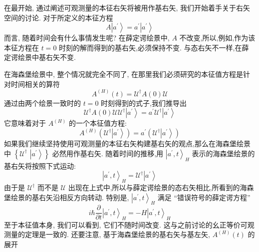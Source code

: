 \documentclass[lang=cn,newtx,10pt,scheme=chinese,thmcnt=section]{elegantbook}
\begin{document}
在最开始, 通过阐述可观测量的本征右矢将被用作基右矢, 我们开始着手关于右矢空间的讨论. 对于所定义的本征方程
\begin{equation}
	A\left| {a}^{\prime }\right\rangle = {a}^{\prime }\left| {a}^{\prime }\right\rangle
\end{equation}
而言, 随着时间会有什么事情发生呢? 在薛定谔绘景中, $A$ 不改变,所以,例如,作为该本征方程在 $t = 0$ 时刻的解而得到的基右矢,必须保持不变. 与态右矢不一样,在薛定谔绘景中基右矢不变.

在海森堡绘景中, 整个情况就完全不同了, 在那里我们必须研究的本征值方程是针对时间相关的算符
\begin{equation}
	{A}^{\left( H\right) }\left( t\right) =\mathcal{U}^{ \dagger }A\left( 0\right)\mathcal{U}
\end{equation}
通过由两个绘景一致时的 $t = 0$ 时刻得到的式子,我们推导出
\begin{equation}
	\mathcal{U}^{ \dagger }A\left( 0\right) \mathcal{U}\mathcal{U}^{ \dagger }\left| {a}^{\prime }\right\rangle = {a}^{\prime }\mathcal{U}^{ \dagger }\left| {a}^{\prime }\right\rangle
\end{equation}
它意味着对于 ${A}^{\left( H\right) }$ 的一个本征值方程:
\begin{equation}
	{A}^{\left( H\right) }\left( {\mathcal{U}^{ \dagger }\left| {a}^{\prime }\right\rangle }\right) = {a}^{\prime }\left( {\mathcal{U}^{ \dagger }\left| {a}^{\prime }\right\rangle }\right)
\end{equation}
如果我们继续坚持使用可观测量的本征右矢构建基右矢的观点,那么在海森堡绘景中 $\left\{ \mathcal{U}^\dagger\right.$ $\left. \left| {a}^{\prime }\right\rangle \right\}$ 必然用作基右矢. 随着时间的推移,用 ${\left| {a}^{\prime }, t\right\rangle }_{H}$ 表示的海森堡绘景的基右矢将按照下式运动:
\begin{equation}\label{2.117}
	{\left| {a}^{\prime }, t\right\rangle }_{H} = \mathcal{U}^{ \dagger }\left| {a}^{\prime }\right\rangle
\end{equation}
由于是 $\mathcal{U}^\dagger$ 而不是 $\mathcal{U}$ 出现在上式中,所以与薛定谔绘景的态右矢相比,所看到的海森堡绘景的基右矢沿相反方向转动. 特别是, ${\left| {a}^{\prime }, t\right\rangle }_{H}$ 满足 “错误符号的薛定谔方程”
\begin{equation}\label{2.118}
	i\hbar \frac{\partial }{\partial t}{\left| {a}^{\prime }, t\right\rangle }_{H} = - H{\left| {a}^{\prime }, t\right\rangle }_{H}
\end{equation}
至于本征值本身, 我们可以看到, 它们不随时间改变. 这与之前讨论的幺正等价可观测量的定理是一致的. 还要注意, 基于海森堡绘景的基右矢与基左矢, ${A}^{\left( H\right) }\left( t\right)$ 的展开
\end{document}
